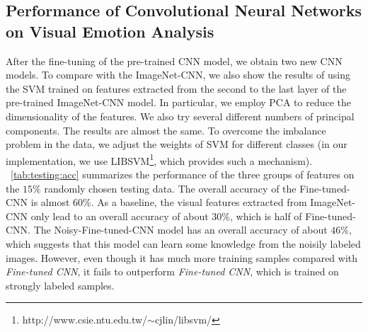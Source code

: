 \documentclass[letterpaper]{article}
\begin{document}
\subsection{Performance of Convolutional Neural Networks on Visual Emotion Analysis}
After the fine-tuning of the pre-trained CNN model, we obtain two new CNN models. To compare with the ImageNet-CNN, we also show the results of using the SVM trained on features extracted from the second to the last layer of the pre-trained ImageNet-CNN model. In particular, we employ PCA to reduce the dimensionality of the features. We also try several different numbers of principal components. The results are almost the same. To overcome the imbalance problem in the data, we adjust the weights of SVM for different classes (in our implementation, we use LIBSVM\footnote{http://www.csie.ntu.edu.tw/$\sim$cjlin/libsvm/}, which provides such a mechanism). \tablename~\ref{tab:testing:acc} summarizes the performance of the three groups of features on the $15\%$ randomly chosen testing data. The overall accuracy of the Fine-tuned-CNN is almost 60\%. As a baseline, the visual features extracted from ImageNet-CNN only lead to an overall accuracy of about $30\%$, which is half of Fine-tuned-CNN. The Noisy-Fine-tuned-CNN model has an overall accuracy of about $46\%$, which suggests that this model can learn some knowledge from the noisily labeled images. However, even though it has much more training samples compared with \textit{Fine-tuned CNN}, it fails to outperform \textit{Fine-tuned CNN}, which is trained on strongly labeled samples.
\end{document}
